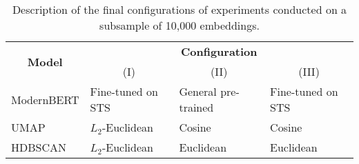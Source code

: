 \begin{longtable}[c]{|l|lll|}
    \caption{Description of the final configurations of experiments conducted on a subsample of 10,000 embeddings.}
    \label{tab:experiment_configs}\\
    \hline
    \multicolumn{1}{|c|}{\multirow{2}{*}{\textbf{Model}}} & \multicolumn{3}{c|}{\textbf{Configuration}}                                                                    \\ \cline{2-4}
    \multicolumn{1}{|c|}{}                                 & \multicolumn{1}{c|}{(I)}               & \multicolumn{1}{c|}{(II)}                & \multicolumn{1}{c|}{(III)} \\ \hline
    \endfirsthead

    \endhead

    ModernBERT                                             & \multicolumn{1}{l|}{Fine-tuned on STS} & \multicolumn{1}{l|}{General pre-trained} & Fine-tuned on STS          \\
    UMAP    & \multicolumn{1}{l|}{$L_2$-Euclidean} & \multicolumn{1}{l|}{Cosine}    & Cosine    \\
    HDBSCAN & \multicolumn{1}{l|}{$L_2$-Euclidean} & \multicolumn{1}{l|}{Euclidean} & Euclidean \\ \hline
\end{longtable}